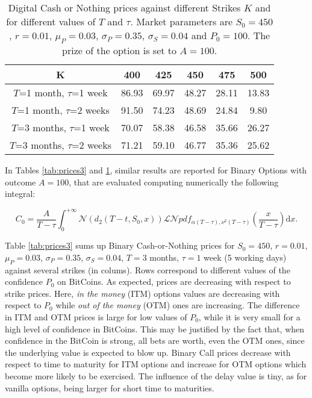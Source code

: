 \documentclass[12pt,centertags,reqno]{amsart}
\numberwithin{equation}{section} \makeatletter
\newcommand{\ud}{\mathrm d}
\begin{document}
\begin{table} 
 \caption{Digital Cash or Nothing prices against different Strikes $K$ and for different values of $T$ and $\tau$. Market parameters are $S_0=450$, $r=0.01$, $\mu_P=0.03$, $\sigma_P=0.35$, $\sigma_S=0.04$ and $P_0=100$. The prize of the option is set to $A=100$.}
\label{tab:prices4}
\centering 
\begin{tabular}{||c|c|c|c|c|c||}
\hline 
K & 400 & 425 & 450 & 475 & 500 \\ 
\hline 
$T$=1 month, $\tau$=1 week & 86.93 & 69.97 & 48.27 & 28.11 & 13.83 \\ 
\hline 
$T$=1 month, $\tau$=2 weeks & 91.50 & 74.23 & 48.69 & 24.84 & 9.80 \\ 
\hline
$T$=3 months, $\tau$=1 week & 70.07 & 58.38 & 46.58 & 35.66 & 26.27 \\ 
\hline
$T$=3 months, $\tau$=2 weeks & 71.21 & 59.10 & 46.77 & 35.36 & 25.62 \\ 
\hline 

\end{tabular}
\end{table}


In Tables \ref{tab:prices3} and \ref{tab:prices4}, similar results are reported for Binary Options with outcome $A=100$, that are evaluated computing numerically the following integral:

\begin{equation}
C_0=\frac{A}{T-\tau} \int_0^{+\infty} \mathcal N\left( d_2(T-t,S_0,x) \right) \mathcal{LN} pdf_{\alpha(T-\tau),\nu^2(T-\tau)} \left(\frac{x}{T-\tau}\right)\ud x.  
\label{digitalexample}
\end{equation}

Table \ref{tab:prices3}  sums up Binary Cash-or-Nothing prices for $S_0=450$, $r=0.01$, $\mu_P=0.03$, $\sigma_P=0.35$, $\sigma_S=0.04$, $T=3$ months, $\tau= 1$ week (5 working days) against several strikes (in colums). Rows correspond to different values of the confidence $P_0$ on BitCoins. As expected, prices are decreasing with respect to strike prices. Here, \textit{in the money} (ITM) options values are decreasing with respect to $P_0$ while \textit{out of the money} (OTM) ones are increasing. The difference in ITM and OTM prices is large for low values of $P_0$, while it is very small for a high level of confidence in BitCoins. This may be justified by the fact that, when confidence in the BitCoin is strong, all bets are worth, even the OTM ones, since the underlying value is expected to blow up. Binary Call prices decrease with respect to time to maturity for ITM options and increase for OTM options which become more likely to be exercised. The influence of the delay value is tiny, as for vanilla options, being larger for short time to maturities.
\end{document}
